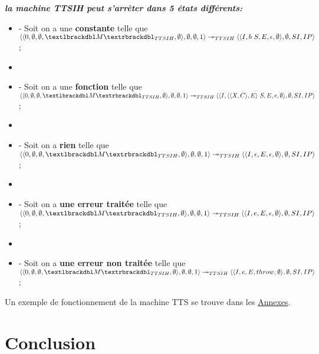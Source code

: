 \documentclass[10pt,a4paper]{report}
\begin{document}
	
	\textbf{\textit{la machine TTSIH peut s'arrêter dans 5 états différents:}}
	\smallbreak
	\begin{itemize}
		\item[] - Soit on a une \textbf{constante} telle que 
		$\langle\langle 0,\emptyset,\emptyset,\textlbrackdbl M\textrbrackdbl_{TTSIH},\emptyset\rangle,\emptyset,\emptyset,1\rangle 
		\twoheadrightarrow_{TTSIH} 
		\langle\langle I,b~S,E,\epsilon,\emptyset\rangle,\emptyset,SI,IP\rangle$;
		\item[] 
		\item[] - Soit on a une \textbf{fonction} telle que
		$\langle\langle 0,\emptyset,\emptyset,\textlbrackdbl M\textrbrackdbl_{TTSIH},\emptyset\rangle,\emptyset,\emptyset,1\rangle 
		\twoheadrightarrow_{TTSIH} 
		\langle\langle I,\langle\langle X,C\rangle,E\rangle~S,E,\epsilon,\emptyset\rangle,\emptyset,SI,IP\rangle$;
		\item[] 
		\item[] - Soit on a \textbf{rien} telle que  
		$\langle\langle 0,\emptyset,\emptyset,\textlbrackdbl M\textrbrackdbl_{TTSIH},\emptyset\rangle,\emptyset,\emptyset,1\rangle 
		\twoheadrightarrow_{TTSIH} 
		\langle\langle I,\epsilon,E,\epsilon,\emptyset\rangle,\emptyset,SI,IP\rangle$;
		\item[]
		\item[] - Soit on a \textbf{une erreur traitée} telle que  
		$\langle\langle 0,\emptyset,\emptyset,\textlbrackdbl M\textrbrackdbl_{TTSIH},\emptyset\rangle,\emptyset,\emptyset,1\rangle 
		\twoheadrightarrow_{TTSIH} 
		\langle\langle I,e,E,\epsilon,\emptyset\rangle,\emptyset,SI,IP\rangle$;
		\item[]
		\item[] - Soit on a \textbf{une erreur non traitée} telle que  
		$\langle\langle 0,\emptyset,\emptyset,\textlbrackdbl M\textrbrackdbl_{TTSIH},\emptyset\rangle,\emptyset,\emptyset,1\rangle 
		\twoheadrightarrow_{TTSIH} 
		\langle\langle I,e,E,throw,\emptyset\rangle,\emptyset,SI,IP\rangle$;
	\end{itemize}
	\bigbreak
	
	
	Un exemple de fonctionnement de la machine TTS se trouve dans les \hyperref[TTSI]{Annexes}.
	\newpage
	
	
	
	
	
	\chapter{Conclusion}
	
\end{document}
